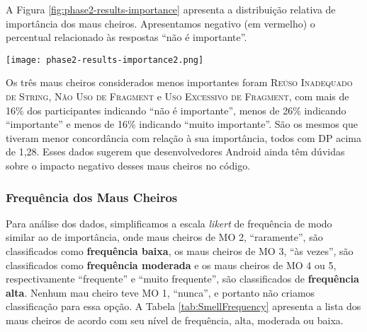 A Figura \ref{fig:phase2-results-importance} apresenta a distribuição relativa de importância dos maus cheiros. Apresentamos negativo (em vermelho) o percentual relacionado às respostas ``não é importante''. 

\begin{figure*}[!htb]
  \centering
  \texttt{[image: phase2-results-importance2.png]}
  \caption{Distribuição relativa de importância dos maus cheiros propostos.}
  \label{fig:phase2-results-importance}
\end{figure*}

Os três maus cheiros considerados menos importantes foram \textsc{\small Reúso Inadequado de String}, \textsc{\small Não Uso de Fragment} e \textsc{\small Uso Excessivo de Fragment}, com mais de 16\% dos participantes indicando ``não é importante'', menos de 26\% indicando ``importante'' e menos de 16\% indicando ``muito importante''. São os mesmos que tiveram menor concordância com relação à sua importância, todos com DP acima de 1,28. Esses dados sugerem que desenvolvedores Android ainda têm dúvidas sobre o impacto negativo desses maus cheiros no código.


\subsubsection{Frequência dos Maus Cheiros}

Para análise dos dados, simplificamos a escala \textit{likert} de frequência de modo similar ao de importância, onde maus cheiros de MO 2, ``raramente'', são classificados como \textbf{\small frequência baixa}, os maus cheiros de MO 3, ``às vezes'', são classificados como \textbf{\small frequência moderada} e os maus cheiros de MO 4 ou 5, respectivamente ``frequente'' e ``muito frequente'', são classificados de \textbf{\small frequência alta}. Nenhum mau cheiro teve MO 1, ``nunca'', e portanto não criamos classificação para essa opção. A Tabela \ref{tab:SmellFrequency} apresenta a lista dos maus cheiros de acordo com seu nível de frequência, alta, moderada ou baixa. 

